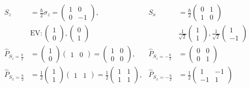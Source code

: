 		\begin{align*}
			S_z &= \frac{\hbar}{2} \sigma_z =
			\begin{pmatrix}
				1 & 0 \\
				0 & -1
			\end{pmatrix} ,&
			S_x &= \frac{\hbar}{2} 
			\begin{pmatrix}
				0 & 1 \\
				1 & 0 
			\end{pmatrix} \\
			&\text{EV} : 
			\begin{pmatrix}
			1 \\
			0 
			\end{pmatrix},
			\begin{pmatrix}
			0 \\
			1
			\end{pmatrix} 
			& &\frac{1}{\sqrt{2}}
			\begin{pmatrix}
			1 \\
			1 
			\end{pmatrix} ,
			\frac{1}{\sqrt{2}}
			\begin{pmatrix}
			1 \\
			-1
			\end{pmatrix} \\
			\hat{P}_{S_z = \frac{\hbar}{2}} &=
			\begin{pmatrix}
			1 \\
			0
			\end{pmatrix} 
			\begin{pmatrix}
			1 & 0
			\end{pmatrix} =
			\begin{pmatrix}
			1 & 0 \\
			0 & 0
			\end{pmatrix}, &
			\hat{P}_{S_z = -\frac{\hbar}{2}} &= 
			\begin{pmatrix}
				0 & 0 \\
				0 & 1
			\end{pmatrix} \\
			\hat{P}_{S_x = \frac{\hbar}{2}} &= 
			\frac{1}{2} 
			\begin{pmatrix}
				1 \\
				1
			\end{pmatrix} 
			\begin{pmatrix}
			1 & 1
			\end{pmatrix}
			= \frac{1}{2} 
			\begin{pmatrix}
			1 & 1 \\
			1 & 1
			\end{pmatrix}, &
			\hat{P}_{S_x = -\frac{\hbar}{2}} &=
			\frac{1}{2} 
			\begin{pmatrix}
				1 & - 1 \\
				-1 & 1 
			\end{pmatrix}
		\end{align*}
